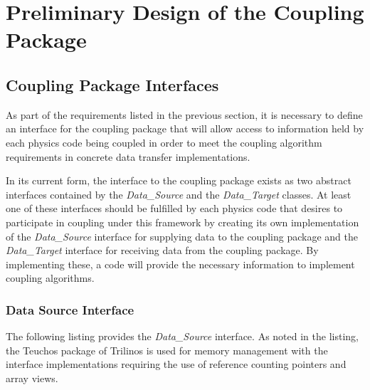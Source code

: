 \documentclass[letterpaper]{article}
\begin{document}
\section{Preliminary Design of the Coupling Package}

\subsection{Coupling Package Interfaces}
As part of the requirements listed in the previous section, it is
necessary to define an interface for the coupling package that will
allow access to information held by each physics code being coupled in
order to meet the coupling algorithm requirements in concrete data
transfer implementations.

In its current form, the interface to the coupling package exists as
two abstract interfaces contained by the {\sl Data\_Source} and the
{\sl Data\_Target} classes. At least one of these interfaces should be
fulfilled by each physics code that desires to participate in coupling
under this framework by creating its own implementation of the {\sl
  Data\_Source} interface for supplying data to the coupling package
and the {\sl Data\_Target} interface for receiving data from the
coupling package. By implementing these, a code will provide the
necessary information to implement coupling algorithms. 

\subsubsection{Data Source Interface}

The following listing provides the {\sl Data\_Source} interface. As
noted in the listing, the Teuchos package of Trilinos is used for
memory management with the interface implementations requiring the use
of reference counting pointers and array views.
\end{document}
